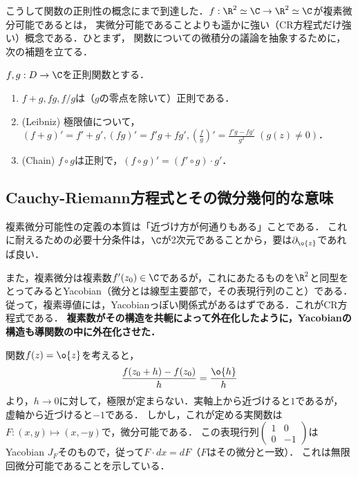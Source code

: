 \documentclass[uplatex, dvipdfmx]{jsreport}
\begin{document}
こうして関数の正則性の概念にまで到達した．$f:\R^2\simeq\C\to\R^2\simeq\C$が複素微分可能であるとは，
実微分可能であることよりも遥かに強い（CR方程式だけ強い）概念である．ひとまず，
関数についての微積分の議論を抽象するために，次の補題を立てる．

\begin{lemma}[関数の正則性の遺伝と微分法則]\label{lemma-propagation-of-regularity}
    $f,g:D\to\C$を正則関数とする．
    \begin{enumerate}
        \item $f+g,fg,f/g$は（$g$の零点を除いて）正則である．
        \item (Leibniz) 極限値について，$(f+g)'=f'+g', (fg)'=f'g+fg', \left(\frac{f}{g}\right)'=\frac{f'g-fg'}{g^2}\;(g(z)\ne 0)$．
        \item (Chain) $f\circ g$は正則で，$(f\circ g)'=(f'\circ g)\cdot g'$．
    \end{enumerate}
\end{lemma}

\subsection{Cauchy-Riemann方程式とその微分幾何的な意味}

\begin{screen}
    複素微分可能性の定義の本質は「近づけ方が何通りもある」ことである．
    これに耐えるための必要十分条件は，$\C$が2次元であることから，要は$\partial_{\o{z}}$であれば良い．

    また，複素微分は複素数$f'(z_0)\in\C$であるが，これにあたるものを$\R^2$と同型をとってみるとYacobian（微分とは線型主要部で，その表現行列のこと）である．
    従って，複素導値には，Yacobianっぽい関係式があるはずである．これがCR方程式である．
    \textbf{複素数がその構造を共軛によって外在化したように，Yacobianの構造も導関数の中に外在化させた．}
\end{screen}

\begin{example}[正則でない複素数値関数の例]
    関数$f(z)=\o{z}$を考えると，
    \[\frac{f(z_0+h)-f(z_0)}{h}=\frac{\o{h}}{h}\]
    より，$h\to 0$に対して，極限が定まらない．実軸上から近づけると$1$であるが，
    虚軸から近づけると$-1$である．
    しかし，これが定める実関数は$F:(x,y)\mapsto(x,-y)$で，微分可能である．
    この表現行列$\begin{pmatrix}1&0\\0&-1\end{pmatrix}$はYacobian $J_F$そのもので，従って$F\cdot dx=dF$（$F$はその微分と一致）．
    これは無限回微分可能であることを示している．
\end{example}
\end{document}
